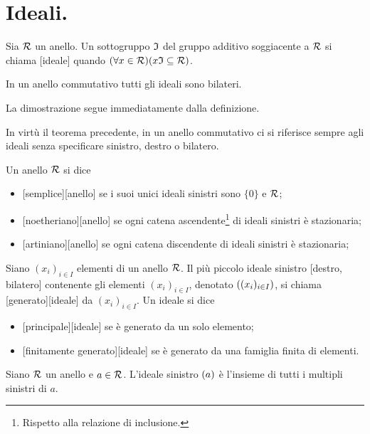 \section{Ideali.}\label{Ideali}
\begin{Definition}
	Sia $\mathcal{R}$ un anello. Un sottogruppo $\mathfrak{I}$ del gruppo additivo soggiacente a $\mathcal{R}$ si chiama [ideale] quando $(\forall x \in \mathcal{R})(x\mathfrak{I} \subseteq \mathcal{R})$.
\end{Definition}
\begin{Theorem}
	In un anello commutativo tutti gli ideali sono bilateri.
\end{Theorem}
\Proof La dimostrazione segue immediatamente dalla definizione. \EndProof
\par In virt\`u il teorema precedente, in un anello commutativo ci si riferisce sempre agli ideali senza specificare sinistro, destro o bilatero.
\begin{Definition}
	Un anello $\mathcal{R}$ si dice
	\begin{itemize}
		\item {}[semplice][anello] se i suoi unici ideali sinistri sono $\lbrace 0 \rbrace$ e $\mathcal{R}$;
		\item {}[noetheriano][anello] se ogni catena ascendente\footnote{Rispetto alla relazione di inclusione.} di ideali sinistri \`e stazionaria;
		\item {}[artiniano][anello] se ogni catena discendente di ideali sinistri \`e stazionaria;
	\end{itemize}
\end{Definition}
\begin{Definition}
	Siano $(x_i)_{i \in I}$ elementi di un anello $\mathcal{R}$. Il pi\`u piccolo ideale sinistro [destro, bilatero] contenente gli elementi $(x_i)_{i \in I}$, denotato $\left ( (x_i)_{i \in I} \right )$, si chiama [generato][ideale] da $(x_i)_{i \in I}$. Un ideale si dice
	\begin{itemize}
		\item {}[principale][ideale] se \`e generato da un solo elemento;
		\item {}[finitamente generato][ideale] se \`e generato da una famiglia finita di elementi.
	\end{itemize}
\end{Definition}
\begin{Theorem}
	Siano $\mathcal{R}$ un anello e $a \in \mathcal{R}$. L'ideale sinistro $\left ( a \right )$ \`e l'insieme di tutti i multipli sinistri di $a$.
\end{Theorem}
